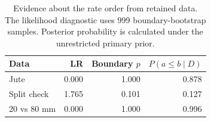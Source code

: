 \begin{table}[htbp]
\centering
\caption{Evidence about the rate order from retained data. The likelihood diagnostic uses 999 boundary-bootstrap samples. Posterior probability is calculated under the unrestricted primary prior.}\label{tab:order-evidence}
\small
\begin{tabular}{lrrr}
\toprule
Data & LR & Boundary $p$ & $P(a\le b\mid D)$ \\
\midrule
Jute & 0.000 & 1.000 & 0.878 \\
Split check & 1.765 & 0.101 & 0.127 \\
20 vs 80 mm & 0.000 & 1.000 & 0.996 \\
\bottomrule
\end{tabular}
\end{table}
